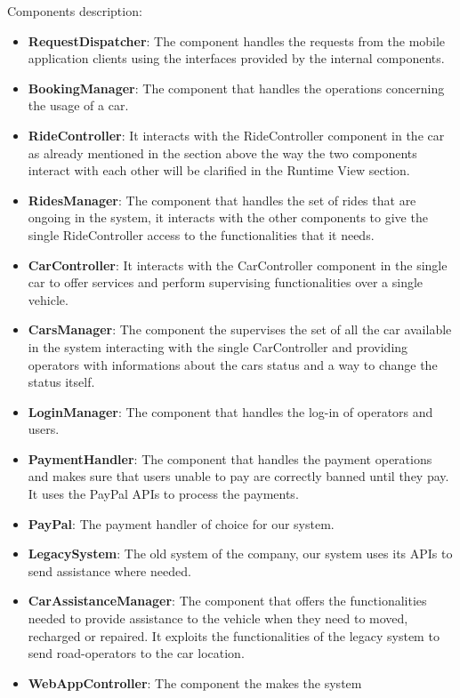 \documentclass[]{article}
\providecommand{\tightlist}{%
  \setlength{\itemsep}{0pt}\setlength{\parskip}{0pt}}
\begin{document}
Components description:

\begin{itemize}
\tightlist
\item
  \textbf{RequestDispatcher}: The component handles the requests from
  the mobile application clients using the interfaces provided by the
  internal components.
\item
  \textbf{BookingManager}: The component that handles the operations
  concerning the usage of a car.
\item
  \textbf{RideController}: It interacts with the RideController
  component in the car as already mentioned in the section above the way
  the two components interact with each other will be clarified in the
  Runtime View section.
\item
  \textbf{RidesManager}: The component that handles the set of rides
  that are ongoing in the system, it interacts with the other components
  to give the single RideController access to the functionalities that
  it needs.
\item
  \textbf{CarController}: It interacts with the CarController component
  in the single car to offer services and perform supervising
  functionalities over a single vehicle.
\item
  \textbf{CarsManager}: The component the supervises the set of all the
  car available in the system interacting with the single CarController
  and providing operators with informations about the cars status and a
  way to change the status itself.
\item
  \textbf{LoginManager}: The component that handles the log-in of
  operators and users.
\item
  \textbf{PaymentHandler}: The component that handles the payment
  operations and makes sure that users unable to pay are correctly
  banned until they pay. It uses the PayPal APIs to process the
  payments.
\item
  \textbf{PayPal}: The payment handler of choice for our system.
\item
  \textbf{LegacySystem}: The old system of the company, our system uses
  its APIs to send assistance where needed.
\item
  \textbf{CarAssistanceManager}: The component that offers the
  functionalities needed to provide assistance to the vehicle when they
  need to moved, recharged or repaired. It exploits the functionalities
  of the legacy system to send road-operators to the car location.
\item
  \textbf{WebAppController}: The component the makes the system

\end{itemize}
\end{document}
